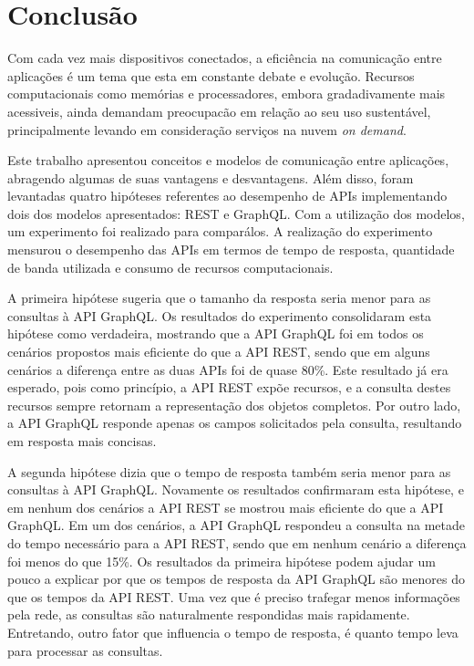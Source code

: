 \chapter{Conclusão}

Com cada vez mais dispositivos conectados, a eficiência na comunicação entre aplicações é um tema que esta em constante debate e evolução. Recursos computacionais como memórias e processadores, embora gradadivamente mais acessiveis, ainda demandam preocupacão em relação ao seu uso sustentável, principalmente levando em consideração serviços na nuvem \textit{on demand}.

Este trabalho apresentou conceitos e modelos de comunicação entre aplicações, abragendo algumas de suas vantagens e desvantagens. Além disso, foram levantadas quatro hipóteses referentes ao desempenho de APIs implementando dois dos modelos apresentados: REST e GraphQL. Com a utilização dos modelos, um experimento foi realizado para comparálos. A realização do experimento mensurou o 
desempenho das APIs em termos de tempo de resposta, quantidade de banda utilizada e consumo de recursos computacionais.

A primeira hipótese sugeria que o tamanho da resposta seria menor para as consultas à API GraphQL. Os resultados do experimento consolidaram esta hipótese como verdadeira, mostrando que a API GraphQL foi em todos os cenários propostos mais eficiente do que a API REST, sendo que em alguns cenários a diferença entre as duas APIs foi de quase 80\%. Este resultado já era esperado, pois como princípio, a API REST expõe recursos, e a consulta destes recursos sempre retornam a representação dos objetos completos. Por outro lado, a API GraphQL responde apenas os campos solicitados pela consulta, resultando em resposta mais concisas.

A segunda hipótese dizia que o tempo de resposta também seria menor para as consultas à API GraphQL. Novamente os resultados confirmaram esta hipótese, e em nenhum dos cenários a API REST se mostrou mais eficiente do que a API GraphQL. Em um dos cenários, a API GraphQL respondeu a consulta na metade do tempo necessário para a API REST, sendo que em nenhum cenário a diferença foi menos do que 15\%. Os resultados da primeira hipótese podem ajudar um pouco a explicar por que os tempos de resposta da API GraphQL são menores do que os tempos da API REST. Uma vez que é preciso trafegar menos informações pela rede, as consultas são naturalmente respondidas mais rapidamente. Entretando, outro fator que influencia o tempo de resposta, é quanto tempo leva para processar as consultas.

